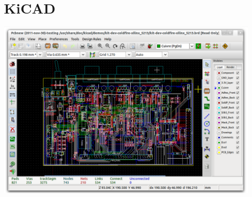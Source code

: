 \chapter{KiCAD}

\noindent\includegraphics[height=0.5\textheight]{kicad/kicad_pcbnew.png}














% 
% 
% 
% 
% 
% 
% 
% 
% 
% 
% 
% 
% 
% 
% 
